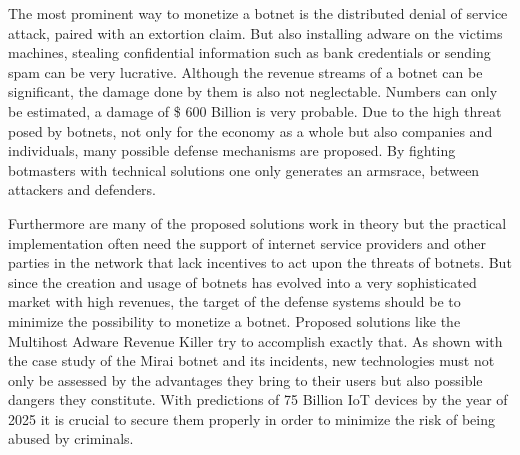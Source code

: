 The most prominent way to monetize a botnet is the distributed denial of service attack, paired with an extortion claim.
But also installing adware on the victims machines, stealing confidential information such as bank credentials or sending spam can be very lucrative.
Although the revenue streams of a botnet can be significant, the damage done by them is also not neglectable.
Numbers can only be estimated, a damage of \$ 600 Billion is very probable.
Due to the high threat posed by botnets, not only for the economy as a whole but also companies and individuals, many possible defense mechanisms are proposed.
By fighting botmasters with technical solutions one only generates an armsrace, between attackers and defenders.

Furthermore are many of the proposed solutions work in theory but the practical implementation often need the support of internet service providers and other parties in the network that lack incentives to act upon the threats of botnets.
But since the creation and usage of botnets has evolved into a very sophisticated market with high revenues, the target of the defense systems should be to minimize the possibility to monetize a botnet.
Proposed solutions like the Multihost Adware Revenue Killer try to accomplish exactly that.
As shown with the case study of the Mirai botnet and its incidents, new technologies must not only be assessed by the advantages they bring to their users but also possible dangers they constitute.
With predictions of 75 Billion IoT devices by the year of 2025 it is crucial to secure them properly in order to minimize the risk of being abused by criminals.

